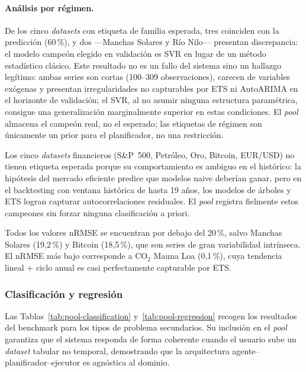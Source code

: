 \paragraph{Análisis por régimen.}
De los cinco \textit{datasets} con etiqueta de familia esperada, tres coinciden con la
predicción (60\,\%), y dos —Manchas Solares y Río Nilo— presentan discrepancia: el
modelo campeón elegido en validación es SVR en lugar de un método estadístico clásico.
Este resultado no es un fallo del sistema sino un hallazgo legítimo: ambas series son
cortas (100–309 observaciones), carecen de variables exógenas y presentan
irregularidades no capturables por ETS ni AutoARIMA en el horizonte de validación;
el SVR, al no asumir ninguna estructura paramétrica, consigue una generalización
marginalmente superior en estas condiciones.
El \textit{pool} almacena el campeón real, no el esperado; las etiquetas de régimen
son únicamente un prior para el planificador, no una restricción.

Los cinco \textit{datasets} financieros (S\&P~500, Petróleo, Oro, Bitcoin,
EUR/USD) no tienen etiqueta esperada porque su comportamiento es ambiguo en el
histórico: la hipótesis del mercado eficiente predice que modelos naive deberían ganar,
pero en el backtesting con ventana histórica de hasta 19 años, los modelos de árboles
y ETS logran capturar autocorrelaciones residuales.
El \textit{pool} registra fielmente estos campeones sin forzar ninguna clasificación
a priori.

Todos los valores nRMSE se encuentran por debajo del 20\,\%, salvo Manchas Solares
(19,2\,\%) y Bitcoin (18,5\,\%), que son series de gran variabilidad intrínseca.
El nRMSE más bajo corresponde a CO$_2$ Mauna Loa (0,1\,\%), cuya tendencia lineal
+ ciclo anual es casi perfectamente capturable por ETS.


\subsubsection{Clasificación y regresión}
\label{sec:pool-clasif-regr}

Las Tablas~\ref{tab:pool-classification} y~\ref{tab:pool-regression} recogen los
resultados del benchmark para los tipos de problema secundarios.
Su inclusión en el \textit{pool} garantiza que el sistema responda de forma coherente
cuando el usuario sube un \textit{dataset} tabular no temporal, demostrando que la
arquitectura agente–planificador–ejecutor es agnóstica al dominio.

